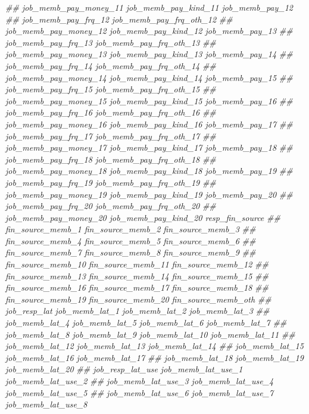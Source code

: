 \documentclass[
]{article}
\newenvironment{Shaded}{\begin{snugshade}}{\end{snugshade}}
\newcommand{\CommentTok}[1]{\textcolor[rgb]{0.56,0.35,0.01}{\textit{#1}}}
\begin{document}
\begin{Shaded}
\begin{Highlighting}[]
\CommentTok{##      job_memb_pay_money_11 job_memb_pay_kind_11 job_memb_pay_12}
\CommentTok{##      job_memb_pay_frq_12 job_memb_pay_frq_oth_12}
\CommentTok{##      job_memb_pay_money_12 job_memb_pay_kind_12 job_memb_pay_13}
\CommentTok{##      job_memb_pay_frq_13 job_memb_pay_frq_oth_13}
\CommentTok{##      job_memb_pay_money_13 job_memb_pay_kind_13 job_memb_pay_14}
\CommentTok{##      job_memb_pay_frq_14 job_memb_pay_frq_oth_14}
\CommentTok{##      job_memb_pay_money_14 job_memb_pay_kind_14 job_memb_pay_15}
\CommentTok{##      job_memb_pay_frq_15 job_memb_pay_frq_oth_15}
\CommentTok{##      job_memb_pay_money_15 job_memb_pay_kind_15 job_memb_pay_16}
\CommentTok{##      job_memb_pay_frq_16 job_memb_pay_frq_oth_16}
\CommentTok{##      job_memb_pay_money_16 job_memb_pay_kind_16 job_memb_pay_17}
\CommentTok{##      job_memb_pay_frq_17 job_memb_pay_frq_oth_17}
\CommentTok{##      job_memb_pay_money_17 job_memb_pay_kind_17 job_memb_pay_18}
\CommentTok{##      job_memb_pay_frq_18 job_memb_pay_frq_oth_18}
\CommentTok{##      job_memb_pay_money_18 job_memb_pay_kind_18 job_memb_pay_19}
\CommentTok{##      job_memb_pay_frq_19 job_memb_pay_frq_oth_19}
\CommentTok{##      job_memb_pay_money_19 job_memb_pay_kind_19 job_memb_pay_20}
\CommentTok{##      job_memb_pay_frq_20 job_memb_pay_frq_oth_20}
\CommentTok{##      job_memb_pay_money_20 job_memb_pay_kind_20 resp_fin_source}
\CommentTok{##      fin_source_memb_1 fin_source_memb_2 fin_source_memb_3}
\CommentTok{##      fin_source_memb_4 fin_source_memb_5 fin_source_memb_6}
\CommentTok{##      fin_source_memb_7 fin_source_memb_8 fin_source_memb_9}
\CommentTok{##      fin_source_memb_10 fin_source_memb_11 fin_source_memb_12}
\CommentTok{##      fin_source_memb_13 fin_source_memb_14 fin_source_memb_15}
\CommentTok{##      fin_source_memb_16 fin_source_memb_17 fin_source_memb_18}
\CommentTok{##      fin_source_memb_19 fin_source_memb_20 fin_source_memb_oth}
\CommentTok{##      job_resp_lat job_memb_lat_1 job_memb_lat_2 job_memb_lat_3}
\CommentTok{##      job_memb_lat_4 job_memb_lat_5 job_memb_lat_6 job_memb_lat_7}
\CommentTok{##      job_memb_lat_8 job_memb_lat_9 job_memb_lat_10 job_memb_lat_11}
\CommentTok{##      job_memb_lat_12 job_memb_lat_13 job_memb_lat_14}
\CommentTok{##      job_memb_lat_15 job_memb_lat_16 job_memb_lat_17}
\CommentTok{##      job_memb_lat_18 job_memb_lat_19 job_memb_lat_20}
\CommentTok{##      job_resp_lat_use job_memb_lat_use_1 job_memb_lat_use_2}
\CommentTok{##      job_memb_lat_use_3 job_memb_lat_use_4 job_memb_lat_use_5}
\CommentTok{##      job_memb_lat_use_6 job_memb_lat_use_7 job_memb_lat_use_8}

\end{Highlighting}
\end{Shaded}
\end{document}
